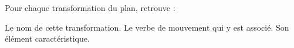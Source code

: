 %
%
Pour chaque transformation du plan, retrouve :
    \begin{tasks}
        \task Le nom de cette transformation.
        \task Le verbe de mouvement qui y est associé.
        \task Son élément caractéristique.
    \end{tasks}
